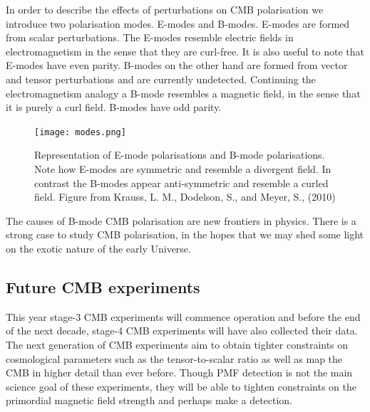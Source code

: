In order to describe the effects of perturbations on CMB polarisation we introduce two polarisation modes. E-modes and B-modes. E-modes are formed from scalar perturbations. The E-modes resemble electric fields in electromagnetism in the sense that they are curl-free. It is also useful to note that E-modes have even parity. B-modes on the other hand are formed from vector and tensor perturbations and are currently undetected. Continuing the electromagnetism analogy a B-mode resembles a magnetic field, in the sense that it is purely a curl field. B-modes have odd parity.

\begin{figure}[h]
\centering
\texttt{[image: modes.png]}
\caption{Representation of E-mode polarisations and B-mode polarisations. Note how E-modes are symmetric and resemble a divergent field. In contrast the B-modes appear anti-symmetric and resemble a curled field. Figure from Krauss, L. M., Dodelson, S., and Meyer, S., (2010) \cite{39087c288ce54d4bb9580169e1666880}}
\label{fig:modes}
\end{figure}

The causes of B-mode CMB polarisation are new frontiers in physics. There is a strong case to study CMB polarisation, in the hopes that we may shed some light on the exotic nature of the early Universe.

\subsection{Future CMB experiments}
This year stage-3 CMB experiments will commence operation and before the end of the next decade, stage-4 CMB experiments will have also collected their data. The next generation of CMB experiments aim to obtain tighter constraints on cosmological parameters such as the tensor-to-scalar ratio as well as map the CMB in higher detail than ever before. Though PMF detection is not the main science goal of these experiments, they will be able to tighten constraints on the primordial magnetic field strength and perhaps make a detection.


